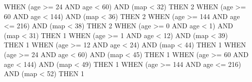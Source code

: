 \documentclass[
  letterpaper,
  DIV=11,
  numbers=noendperiod]{scrartcl}
\newenvironment{Shaded}{\begin{snugshade}}{\end{snugshade}}
\newcommand{\ControlFlowTok}[1]{\textcolor[rgb]{0.00,0.23,0.31}{#1}}
\newcommand{\DecValTok}[1]{\textcolor[rgb]{0.68,0.00,0.00}{#1}}
\newcommand{\KeywordTok}[1]{\textcolor[rgb]{0.00,0.23,0.31}{#1}}
\newcommand{\NormalTok}[1]{\textcolor[rgb]{0.00,0.23,0.31}{#1}}
\newcommand{\OperatorTok}[1]{\textcolor[rgb]{0.37,0.37,0.37}{#1}}
\begin{document}
\begin{Shaded}
\begin{Highlighting}[]
         \ControlFlowTok{WHEN}\NormalTok{ (age }\OperatorTok{\textgreater{}=}  \DecValTok{24} \KeywordTok{AND}\NormalTok{ age }\OperatorTok{\textless{}}   \DecValTok{60}\NormalTok{) }\KeywordTok{AND}\NormalTok{ (map }\OperatorTok{\textless{}} \DecValTok{32}\NormalTok{) }\ControlFlowTok{THEN} \DecValTok{2}
         \ControlFlowTok{WHEN}\NormalTok{ (age }\OperatorTok{\textgreater{}=}  \DecValTok{60} \KeywordTok{AND}\NormalTok{ age }\OperatorTok{\textless{}}  \DecValTok{144}\NormalTok{) }\KeywordTok{AND}\NormalTok{ (map }\OperatorTok{\textless{}} \DecValTok{36}\NormalTok{) }\ControlFlowTok{THEN} \DecValTok{2}
         \ControlFlowTok{WHEN}\NormalTok{ (age }\OperatorTok{\textgreater{}=} \DecValTok{144} \KeywordTok{AND}\NormalTok{ age }\OperatorTok{\textless{}=} \DecValTok{216}\NormalTok{) }\KeywordTok{AND}\NormalTok{ (map }\OperatorTok{\textless{}} \DecValTok{38}\NormalTok{) }\ControlFlowTok{THEN} \DecValTok{2}
         \ControlFlowTok{WHEN}\NormalTok{ (age }\OperatorTok{\textgreater{}=}   \DecValTok{0} \KeywordTok{AND}\NormalTok{ age }\OperatorTok{\textless{}}    \DecValTok{1}\NormalTok{) }\KeywordTok{AND}\NormalTok{ (map }\OperatorTok{\textless{}} \DecValTok{31}\NormalTok{) }\ControlFlowTok{THEN} \DecValTok{1}
         \ControlFlowTok{WHEN}\NormalTok{ (age }\OperatorTok{\textgreater{}=}   \DecValTok{1} \KeywordTok{AND}\NormalTok{ age }\OperatorTok{\textless{}}   \DecValTok{12}\NormalTok{) }\KeywordTok{AND}\NormalTok{ (map }\OperatorTok{\textless{}} \DecValTok{39}\NormalTok{) }\ControlFlowTok{THEN} \DecValTok{1}
         \ControlFlowTok{WHEN}\NormalTok{ (age }\OperatorTok{\textgreater{}=}  \DecValTok{12} \KeywordTok{AND}\NormalTok{ age }\OperatorTok{\textless{}}   \DecValTok{24}\NormalTok{) }\KeywordTok{AND}\NormalTok{ (map }\OperatorTok{\textless{}} \DecValTok{44}\NormalTok{) }\ControlFlowTok{THEN} \DecValTok{1}
         \ControlFlowTok{WHEN}\NormalTok{ (age }\OperatorTok{\textgreater{}=}  \DecValTok{24} \KeywordTok{AND}\NormalTok{ age }\OperatorTok{\textless{}}   \DecValTok{60}\NormalTok{) }\KeywordTok{AND}\NormalTok{ (map }\OperatorTok{\textless{}} \DecValTok{45}\NormalTok{) }\ControlFlowTok{THEN} \DecValTok{1}
         \ControlFlowTok{WHEN}\NormalTok{ (age }\OperatorTok{\textgreater{}=}  \DecValTok{60} \KeywordTok{AND}\NormalTok{ age }\OperatorTok{\textless{}}  \DecValTok{144}\NormalTok{) }\KeywordTok{AND}\NormalTok{ (map }\OperatorTok{\textless{}} \DecValTok{49}\NormalTok{) }\ControlFlowTok{THEN} \DecValTok{1}
         \ControlFlowTok{WHEN}\NormalTok{ (age }\OperatorTok{\textgreater{}=} \DecValTok{144} \KeywordTok{AND}\NormalTok{ age }\OperatorTok{\textless{}=} \DecValTok{216}\NormalTok{) }\KeywordTok{AND}\NormalTok{ (map }\OperatorTok{\textless{}} \DecValTok{52}\NormalTok{) }\ControlFlowTok{THEN} \DecValTok{1}

\end{Highlighting}
\end{Shaded}
\end{document}
